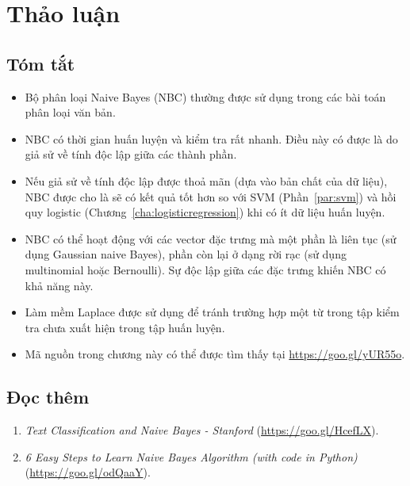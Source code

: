\section{Thảo luận}
\subsection{Tóm tắt}
\begin{itemize}
\item Bộ phân loại Naive Bayes (NBC) thường được sử dụng trong các bài toán phân loại văn bản. 
 
\item NBC có thời gian huấn luyện và kiểm tra rất nhanh. Điều này có được là do giả sử về tính độc lập giữa các thành phần. 
 
\item Nếu giả sử về tính độc lập được thoả mãn (dựa vào bản chất của dữ liệu),
NBC được cho là sẽ có kết quả tốt hơn so với SVM
(Phần~\ref{par:svm}) và hồi quy logistic (Chương~\ref{cha:logisticregression})
khi có ít dữ liệu huấn luyện.
 
\item NBC có thể hoạt động với các vector đặc trưng mà một phần là liên tục (sử
dụng Gaussian naive Bayes), phần còn lại ở dạng rời rạc (sử dụng multinomial
hoặc Bernoulli). Sự độc lập giữa các đặc trưng khiến NBC có khả năng này.
 
\item Làm mềm Laplace được sử dụng
để tránh trường hợp một từ trong tập kiểm tra chưa xuất hiện trong tập huấn luyện.
 
\item Mã nguồn trong chương này có thể được tìm thấy tại \url{https://goo.gl/yUR55o}.


\end{itemize}
 
\subsection{Đọc thêm}

\begin{enumerate}
    \item \textit{Text Classification and Naive Bayes - Stanford} (\url{https://goo.gl/HcefLX}). 

    \item \textit{6 Easy Steps to Learn Naive Bayes Algorithm (with code in Python)} (\url{https://goo.gl/odQaaY}). 
\end{enumerate}


